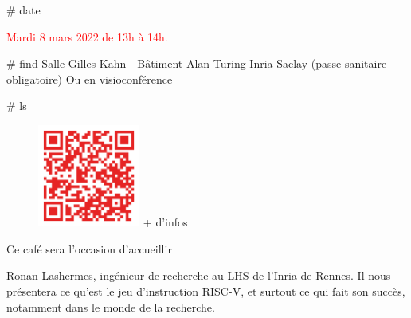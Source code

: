 \documentclass[final]{beamer}
\newlength{\twocolwid}
\begin{document}
\begin{frame}[t]
\begin{columns}[t]
\begin{column}{\twocolwid}
\vspace{1in}

\begin{block}{\# date}

{\textcolor{red}{
     Mardi 8 mars 2022 de 13h \`{a} 14h.
}}

\end{block}


\begin{block}{\# find}
     Salle Gilles Kahn - B\^{a}timent Alan Turing Inria Saclay (passe sanitaire obligatoire)\newline
     Ou en visioconf\'{e}rence
\end{block}

\begin{block}{\# ls}

\begin{figure}
\centering
\vspace{-0.7in}
\includegraphics[width=0.3\textwidth]{qrcode.png}\newline
+ d'infos
\end{figure}

     Ce caf\'{e} sera l'occasion d'accueillir 


Ronan Lashermes, ing\'{e}nieur de recherche au LHS de l'Inria de Rennes. Il nous pr\'{e}sentera
ce qu'est le jeu d'instruction RISC-V, et surtout ce qui fait son succ\`{e}s,
notamment dans le monde de la recherche.

\vspace{1.8in}

\end{block}





\end{column}
\end{columns}
\end{frame}
\end{document}
